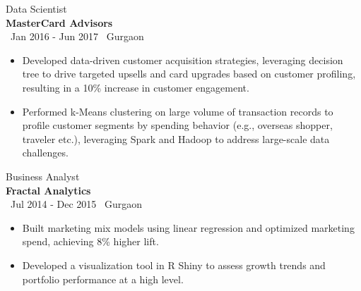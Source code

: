 \documentclass[a4paper,10pt]{article}
\begin{document}
{\large Data Scientist} \\
\textbf{MasterCard Advisors} \\
\faCalendar \, Jan 2016 - Jun 2017 \hfill \faMapMarker \, Gurgaon
\begin{itemize}[itemsep=1pt, topsep=0pt]
    \item Developed data-driven customer acquisition strategies, leveraging decision tree to drive targeted upsells and card upgrades based on customer profiling, resulting in a 10\% increase in customer engagement.
    \item Performed k-Means clustering on large volume of transaction records to profile customer segments by spending behavior (e.g., overseas shopper, traveler etc.), leveraging Spark and Hadoop to address large-scale data challenges.
\end{itemize}

{\large Business Analyst} \\
\textbf{Fractal Analytics} \\
\faCalendar \, Jul 2014 - Dec 2015 \hfill \faMapMarker \, Gurgaon
\begin{itemize}[itemsep=1pt, topsep=0pt]
    \item Built marketing mix models using linear regression and optimized marketing spend, achieving 8\% higher lift.
    \item Developed a visualization tool in R Shiny to assess growth trends and portfolio performance at a high level.
\end{itemize}
\end{document}
